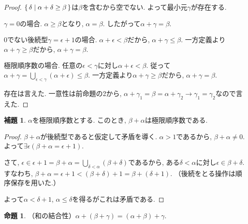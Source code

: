 \documentclass[a4paper, twoside]{bxjsarticle}
\theoremstyle{definition}
\newtheorem{prop}[thm]{命題}
\newtheorem{lem}[thm]{補題}
\begin{document}
        \begin{proof}
            $\set{\delta|\alpha+\delta\geq\beta}$は$\beta$を含むから空でない. よって最小元$\gamma$が存在する.
            
            $\gamma =0$の場合. $\alpha\geq\beta$となり, $\alpha=\beta$. したがって$\alpha+\gamma=\beta$.
            
            0でない後続型$\gamma=\epsilon+1$の場合. $\alpha+\epsilon<\beta$だから, $\alpha+\gamma\leq\beta$. 一方定義より$\alpha+\gamma\geq\beta$だから, $\alpha+\gamma=\beta$.
            
            極限順序数の場合. 任意の$\epsilon<\gamma$に対し$\alpha+\epsilon<\beta$. 従って$\alpha+\gamma = \bigcup_{\epsilon<\gamma}(\alpha+\epsilon)\leq\beta$. 一方定義より$\alpha+\gamma\geq\beta$だから, $\alpha+\gamma=\beta$.
            
            存在は言えた. 一意性は前命題の2から, $\alpha+\gamma_1=\beta=\alpha+\gamma_2\to\gamma_1=\gamma_2$なので言えた.
        \end{proof}
        \begin{lem}\label{pluswithlimislim}
            $\alpha$を極限順序数とする. このとき, $\beta+\alpha$は極限順序数である.
        \end{lem}
        \begin{proof}
            $\beta+\alpha$が後続型であると仮定して矛盾を導く. $\alpha>1$であるから, $\beta+\alpha\neq0$. よって$\exists \epsilon(\beta+\alpha=\epsilon+1)$.
                
            さて, $\epsilon\in\epsilon+1=\beta+\alpha = \bigcup_{\delta<\alpha}(\beta+\delta)$であるから, ある$\delta<\alpha$に対し$\epsilon\in\beta+\delta$. すなわち, $\beta+\alpha = \epsilon+1 < (\beta+\delta)+1 = \beta+(\delta+1)$. （後続をとる操作は順序保存を用いた.）
                
            よって$\alpha<\delta+1$, $\alpha\leq\delta$を得るがこれは矛盾である.
        \end{proof}
        \begin{prop}
            （和の結合性）$\alpha+(\beta+\gamma)=(\alpha+\beta)+\gamma$.
        \end{prop}
\end{document}
